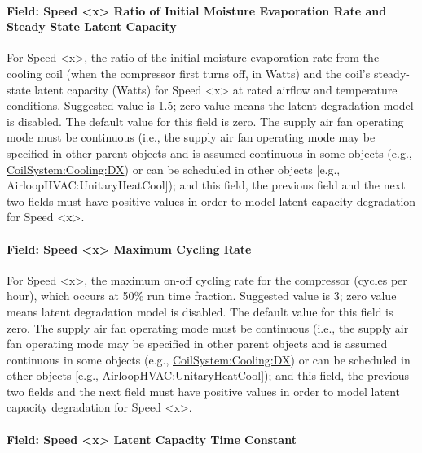 \paragraph{Field: Speed \textless{}x\textgreater{} Ratio of Initial Moisture Evaporation Rate and Steady State Latent Capacity}\label{field-speed-x-ratio-of-initial-moisture-evaporation-rate-and-steady-state-latent-capacity}

For Speed \textless{}x\textgreater{}, the ratio of the initial moisture evaporation rate from the cooling coil (when the compressor first turns off, in Watts) and the coil's steady-state latent capacity (Watts) for Speed \textless{}x\textgreater{} at rated airflow and temperature conditions. Suggested value is 1.5; zero value means the latent degradation model is disabled. The default value for this field is zero. The supply air fan operating mode must be continuous (i.e., the supply air fan operating mode may be specified in other parent objects and is assumed continuous in some objects (e.g., \hyperref[coilsystemcoolingdx]{CoilSystem:Cooling:DX}) or can be scheduled in other objects {[}e.g., AirloopHVAC:UnitaryHeatCool{]}); and this field, the previous field and the next two fields must have positive values in order to model latent capacity degradation for Speed \textless{}x\textgreater{}.

\paragraph{Field: Speed \textless{}x\textgreater{} Maximum Cycling Rate}\label{field-speed-x-maximum-cycling-rate}

For Speed \textless{}x\textgreater{}, the maximum on-off cycling rate for the compressor (cycles per hour), which occurs at 50\% run time fraction. Suggested value is 3; zero value means latent degradation model is disabled. The default value for this field is zero. The supply air fan operating mode must be continuous (i.e., the supply air fan operating mode may be specified in other parent objects and is assumed continuous in some objects (e.g., \hyperref[coilsystemcoolingdx]{CoilSystem:Cooling:DX}) or can be scheduled in other objects {[}e.g., AirloopHVAC:UnitaryHeatCool{]}); and this field, the previous two fields and the next field must have positive values in order to model latent capacity degradation for Speed \textless{}x\textgreater{}.

\paragraph{Field: Speed \textless{}x\textgreater{} Latent Capacity Time Constant}\label{field-speed-x-latent-capacity-time-constant}

